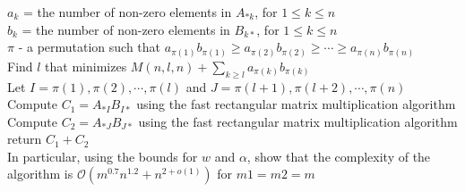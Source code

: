 \documentclass[10pt,a4paper]{article}
\begin{document}
$a_k$ = the number of non-zero elements in $A_{*k}$, for $1\leq k\leq n $\\

$b_k$ = the number of non-zero elements in $B_{k*}$, for $1\leq k\leq n$ \\

$\pi$ - a permutation such that $a_{\pi(1)}b_{\pi(1)}\geq a_{\pi(2)}b_{\pi(2)}\geq\cdots \geq a_{\pi(n)}b_{\pi(n)}$\\

Find $l$ that minimizes $M(n,l,n)+\sum _{k\geq l} a_{\pi(k)}b_{\pi(k)}$\\

Let $I={\pi(1),\pi(2),\cdots,\pi(l)}$ and $J={\pi(l+1),\pi(l+2),\cdots,\pi(n)}$\\

Compute $C_1=A_{*I}B_{I*}$ using the fast rectangular matrix multiplication algorithm\\

Compute $C_2=A_{*J}B_{J*}$ using the fast rectangular matrix multiplication algorithm\\

return $C_1+C_2$\\
In particular, using the bounds for $w$ and $\alpha$, show that the complexity of the algorithm is $\mathcal{O}(m^{0.7}n^{1.2}+n^{2+o(1)})$ for $m1=m2=m$
\end{document}
